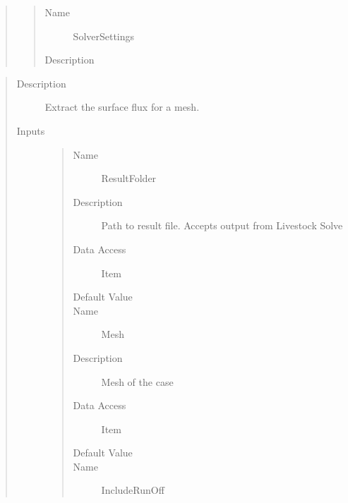 \documentclass[letterpaper,10pt,english]{sphinxmanual}
\begin{document}
\begin{quote}
\begin{description}
\begin{quote}
\begin{description}
\item[{Name}] \leavevmode
SolverSettings

\item[{Description}] \leavevmode
{}

\end{description}\end{quote}

\end{description}\end{quote}

\begin{quote}\begin{description}
\item[{Description}] \leavevmode
Extract the surface flux for a mesh.

\item[{Inputs}] \leavevmode\begin{quote}\begin{description}
\item[{Name}] \leavevmode
ResultFolder

\item[{Description}] \leavevmode
Path to result file. Accepts output from Livestock Solve

\item[{Data Access}] \leavevmode
Item

\item[{Default Value}] \leavevmode
{}

\item[{Name}] \leavevmode
Mesh

\item[{Description}] \leavevmode
Mesh of the case

\item[{Data Access}] \leavevmode
Item

\item[{Default Value}] \leavevmode
{}

\item[{Name}] \leavevmode
IncludeRunOff


\end{description}
\end{quote}
\end{description}
\end{quote}
\end{document}

